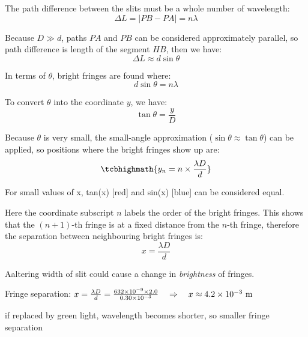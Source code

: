 The path difference between the slits must be a whole number of wavelength: $$ \Delta L = \big|PB-PA\big| = n\lambda $$

Because $D \gg d$, paths $PA$ and $PB$ can be considered approximately parallel, so path difference is length of the segment $HB$, then we have: $$\Delta L \approx d\sin\theta$$

In terms of $\theta$, bright fringes are found where: $$ d\sin\theta = n\lambda $$

To convert $\theta$ into the coordinate $y$, we have: $$\tan \theta = \frac{y}{D}$$

Because $\theta$ is very small, the small-angle approximation ($\sin \theta \approx \tan \theta$) can be applied, so positions where the bright fringes show up are: $$ \tcbhighmath{y_n =  n \times \frac{\lambda D}{d}} $$\begin{marginfigure}

\caption{For small values of x, tan(x) [red] and sin(x) [blue] can be considered equal.} 
\end{marginfigure}


Here the coordinate subscript $n$ labels the order of the bright fringes. This shows that the $(n+1)$-th fringe is at a fixed distance from the $n$-th fringe, therefore the separation between neighbouring bright fringes is: $$ {x=\frac{\lambda D}{d}} $$

Aaltering width of slit could cause a change in \emph{brightness} of fringes.


\begin{soln} Fringe separation: $ x = \frac{\lambda D}{d} = \frac{632 \times 10^{-9} \times 2.0 }{0.30 \times 10^{-3}} \quad \Rightarrow \quad x \approx 4.2 \times 10^{-3} \text{ m}$

if replaced by green light, wavelength becomes shorter, so smaller fringe separation \end{soln}


